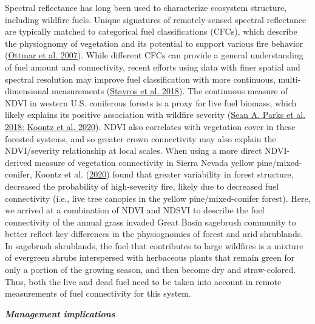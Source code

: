 \documentclass[
  12pt,
]{article}
\begin{document}
Spectral reflectance has long been used to characterize ecosystem
structure, including wildfire fuels. Unique signatures of
remotely-sensed spectral reflectance are typically matched to
categorical fuel classifications (CFCs), which describe the physiognomy
of vegetation and its potential to support various fire behavior
(\protect\hyperlink{ref-Ottmar2007}{Ottmar et al. 2007}). While
different CFCs can provide a general understanding of fuel amount and
connectivity, recent efforts using data with finer spatial and spectral
resolution may improve fuel classification with more continuous,
multi-dimensional measurements
(\protect\hyperlink{ref-Stavros2018}{Stavros et al. 2018}). The
continuous measure of NDVI in western U.S. coniferous forests is a proxy
for live fuel biomass, which likely explains its positive association
with wildfire severity (\protect\hyperlink{ref-Parks2018}{Sean A. Parks
et al. 2018}; \protect\hyperlink{ref-Koontz2020}{Koontz et al. 2020}).
NDVI also correlates with vegetation cover in these forested systems,
and so greater crown connectivity may also explain the NDVI/severity
relationship at local scales. When using a more direct NDVI-derived
measure of vegetation connectivity in Sierra Nevada yellow
pine/mixed-conifer, Koontz et al.
(\protect\hyperlink{ref-Koontz2020}{2020}) found that greater
variability in forest structure, decreased the probability of
high-severity fire, likely due to decreased fuel connectivity (i.e.,
live tree canopies in the yellow pine/mixed-conifer forest). Here, we
arrived at a combination of NDVI and NDSVI to describe the fuel
connectivity of the annual grass invaded Great Basin sagebrush community
to better reflect key differences in the physiognomies of forest and
arid shrublands. In sagebrush shrublands, the fuel that contributes to
large wildfires is a mixture of evergreen shrubs interspersed with
herbaceous plants that remain green for only a portion of the growing
season, and then become dry and straw-colored. Thus, both the live and
dead fuel need to be taken into account in remote measurements of fuel
connectivity for this system.

\textbf{\emph{Management implications}}
\end{document}
